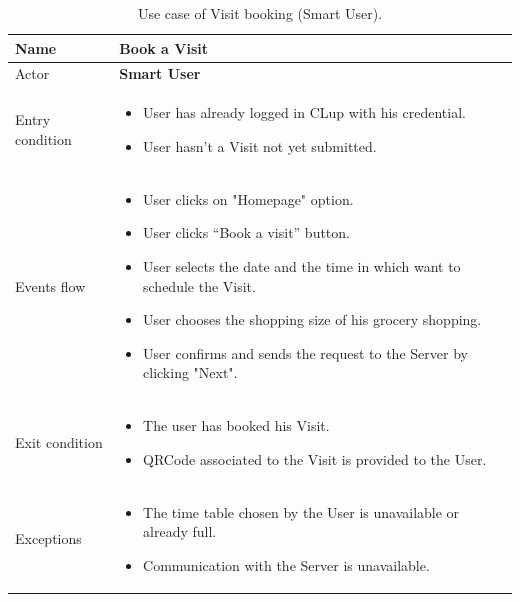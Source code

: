 \begin{table}[H]\begin{tabular}{|p{5cm} | p{7cm} | }
	\hline
	Name & \textbf{Book a Visit} \\
	\hline
	Actor & \textbf{Smart User} \\
	\hline
	Entry condition &
	\begin{itemize}
		\item User has already logged in CLup with his credential.  
		\item User hasn't a Visit not yet submitted. 
	\end{itemize} \\
	\hline
	Events flow & 
	\begin{itemize}
		\item User clicks on "Homepage" option.
		\item User clicks “Book a visit” button.
		\item User selects the date and the time in which want to schedule the Visit.
		\item User chooses the shopping size of his grocery shopping.
		\item User confirms and sends the request to the Server by clicking "Next". 
	\end{itemize} \\
	\hline
	Exit condition & 	
    \begin{itemize}
    \item The user has booked his Visit.
    \item QRCode associated to the Visit is provided to the User. 
    \end{itemize}
 \\
	\hline 
	Exceptions & \begin{itemize}
		\item The time table chosen by the User is unavailable or already full.
        \item Communication with the Server is unavailable.
	\end{itemize}  \\ 
	\hline
\end{tabular}
\caption{Use case of Visit booking (Smart User).}
\end{table}

\bigbreak

